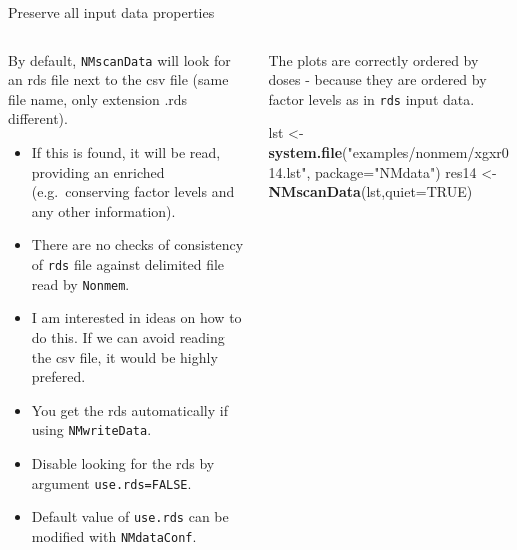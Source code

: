 \documentclass[
  8pt,
  ignorenonframetext,
  aspectratio=169]{beamer}
\newenvironment{Shaded}{\begin{snugshade}}{\end{snugshade}}
\newcommand{\DataTypeTok}[1]{\textcolor[rgb]{0.13,0.29,0.53}{#1}}
\newcommand{\KeywordTok}[1]{\textcolor[rgb]{0.13,0.29,0.53}{\textbf{#1}}}
\newcommand{\NormalTok}[1]{#1}
\newcommand{\OtherTok}[1]{\textcolor[rgb]{0.56,0.35,0.01}{#1}}
\newcommand{\StringTok}[1]{\textcolor[rgb]{0.31,0.60,0.02}{#1}}
\begin{document}
\begin{frame}[fragile]{Preserve all input data properties}
\protect\hypertarget{preserve-all-input-data-properties}{}
\begin{columns}[T]
\begin{column}{0.48\textwidth}
By default, \texttt{NMscanData} will look for an rds file next to the
csv file (same file name, only extension .rds different).

\begin{itemize}
\item
  If this is found, it will be read, providing an enriched
  (e.g.~conserving factor levels and any other information).
\item
  There are no checks of consistency of \texttt{rds} file against
  delimited file read by \texttt{Nonmem}.
\item
  I am interested in ideas on how to do this. If we can avoid reading
  the csv file, it would be highly prefered.
\item
  You get the rds automatically if using \texttt{NMwriteData}.
\item
  Disable looking for the rds by argument \texttt{use.rds=FALSE}.
\item
  Default value of \texttt{use.rds} can be modified with
  \texttt{NMdataConf}.
\end{itemize}
\end{column}

\begin{column}{0.48\textwidth}
The plots are correctly ordered by doses - because they are ordered by
factor levels as in \texttt{rds} input data.

\footnotesize

\begin{Shaded}
\begin{Highlighting}[]
\NormalTok{lst \textless{}{-}}\StringTok{ }\KeywordTok{system.file}\NormalTok{(}\StringTok{"examples/nonmem/xgxr014.lst"}\NormalTok{,}
                   \DataTypeTok{package=}\StringTok{"NMdata"}\NormalTok{)}
\NormalTok{res14 \textless{}{-}}\StringTok{ }\KeywordTok{NMscanData}\NormalTok{(lst,}\DataTypeTok{quiet=}\OtherTok{TRUE}\NormalTok{)}
\end{Highlighting}
\end{Shaded}


\end{column}
\end{columns}
\end{frame}
\end{document}
